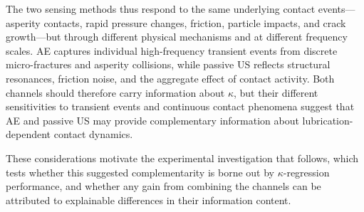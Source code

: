 The two sensing methods thus respond to the same underlying contact events---asperity contacts, rapid pressure changes, friction, particle impacts, and crack growth---but through different physical mechanisms and at different frequency scales. AE captures individual high-frequency transient events from discrete micro-fractures and asperity collisions, while passive US reflects structural resonances, friction noise, and the aggregate effect of contact activity. Both channels should therefore carry information about $\kappa$, but their different sensitivities to transient events and continuous contact phenomena suggest that AE and passive US may provide complementary information about lubrication-dependent contact dynamics.

These considerations motivate the experimental investigation that follows, which tests whether this suggested complementarity is borne out by $\kappa$-regression performance, and whether any gain from combining the channels can be attributed to explainable differences in their information content.